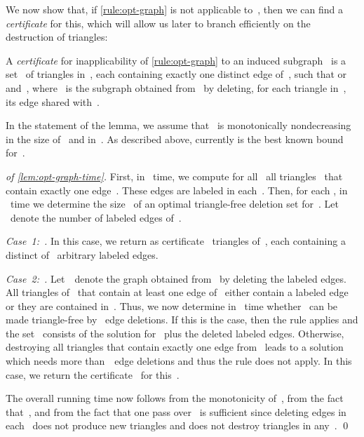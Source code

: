 \documentclass[envcountsame,numbook,smallextended]{svjour3}
\numberwithin{equation}{section}
\numberwithin{figure}{section}
\begin{document}
\noindent We now show that, if \cref{rule:opt-graph} is not applicable to~, then we can find a \emph{certificate} for this, which will allow us later to branch efficiently on the destruction of triangles:
\begin{definition}[Certificate]
  A \emph{certificate} for inapplicability of \cref{rule:opt-graph} to an induced subgraph~ is a set~ of triangles in~, each containing exactly one distinct edge of~, such that  or~ and~, where~ is the subgraph obtained from~ by deleting, for each triangle in~, its edge shared with~.
\end{definition}
\noindent
In the statement of the lemma,
we assume that
~is monotonically nondecreasing
in the size of~ and in~.
As described above,
currently 
is the best known bound for~.
\begin{proof}[of \cref{lem:opt-graph-time}]
  First, in~ time, we compute for all~ all triangles~ that contain exactly one edge~. These edges are labeled in each~.  Then, for each , in ~time we determine the size~ of an optimal triangle-free deletion set for~. Let ~denote the number of labeled edges of~.  

\emph{Case~1:~.} In this case, we return as certificate ~triangles of~, each containing a distinct of ~arbitrary labeled edges.  

\emph{Case~2:~.} Let~~denote the graph obtained from~ by deleting the labeled edges. All triangles of~ that contain at least one edge of~ either contain a labeled edge or they are contained in~. Thus, we now determine in~ time whether~ can be made triangle-free by ~edge deletions. If this is the case, then the rule applies and the set~ consists of the solution for~ plus the deleted labeled edges.  Otherwise, destroying all triangles that contain exactly one edge from~ leads to a solution which needs more than~~edge deletions and thus the rule does not apply. In this case, we return the certificate~ for this~. 

The overall running time now follows from the monotonicity of~,
from the fact that~, and from the fact that one pass
over~ is sufficient since deleting edges in each~ does
not produce new triangles and does not destroy triangles in
any~.  \qed\end{proof}
\end{document}
